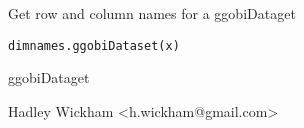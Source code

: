 \begin{Description}\relax
Get row and column names for a ggobiDataget
\end{Description}
\begin{Usage}
\begin{verbatim}dimnames.ggobiDataset(x)\end{verbatim}
\end{Usage}
\begin{Arguments}
\begin{ldescription}
\item[\code{x}] ggobiDataget
\end{ldescription}
\end{Arguments}
\begin{Details}\relax
\end{Details}
\begin{Author}\relax
Hadley Wickham <h.wickham@gmail.com>
\end{Author}
\begin{Examples}
\begin{ExampleCode}\end{ExampleCode}
\end{Examples}

